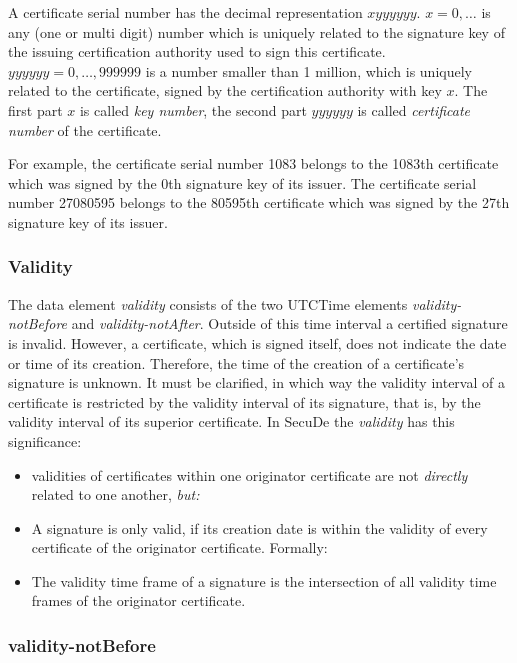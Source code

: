 A certificate serial number has the decimal representation $xyyyyyy$.
$x=0,\ldots$ is any (one or multi digit) number
which is uniquely related to the signature key of the issuing certification
authority used to sign this certificate.
$yyyyyy=0,\ldots,999999$ is a number smaller than 1 million, which
is uniquely related to the certificate,
signed by the certification authority with key $x$.
The first part $x$ is called {\em key number},
the second part $yyyyyy$ is called {\em certificate number} of the
certificate.

For example, the certificate serial number 1083
belongs to the 1083th certificate which was signed
by the 0th signature key of its issuer.
The certificate serial number 27080595
belongs to the 80595th certificate which was signed
by the 27th signature key of its issuer.

\subsubsection{Validity}
\label{sc-v}

The data element {\em validity} consists of the two UTCTime elements
{\em validity-notBefore} and {\em validity-notAfter}.
Outside of this time interval a certified signature is invalid.
However, a certificate, which is signed itself, does not indicate
the date or time of its creation. Therefore, the time of the creation
of a certificate's signature is unknown. It must be clarified,
in which way the validity interval of a certificate is restricted
by the validity interval of its signature, that is, by the validity interval
of its superior certificate.
In SecuDe the {\em validity} has this significance:

\begin{itemize}
\item  validities of certificates within one originator certificate
are not {\em directly} related to one another, {\em but:}
\item A signature is only valid,
if its creation date is within the validity of every certificate
of the originator certificate.
Formally:
\item The validity time frame of a signature is the intersection
of all validity time frames of the originator certificate.
\end{itemize}

\subsubsection{validity-notBefore}
\label{sc-vb}

